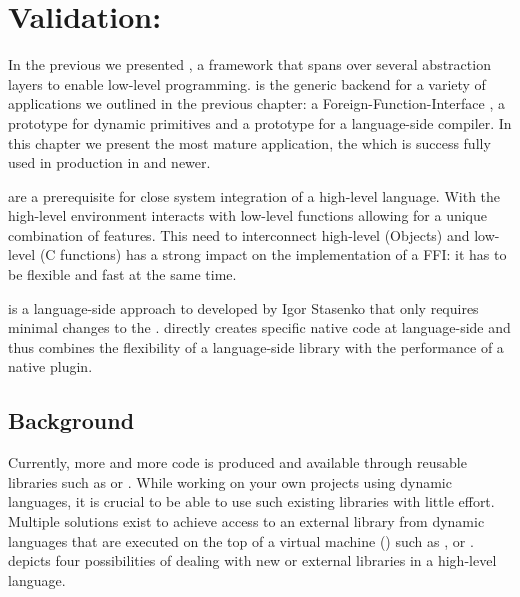 
\chapter{Validation: \FFI}
\minitoc
\introduction

In the previous  we presented \B, a framework that spans over several abstraction layers to enable low-level programming.
\B is the generic backend for a variety of applications we outlined in the previous chapter: a Foreign-Function-Interface \FFI, a prototype for dynamic primitives and a prototype for a language-side \JIT compiler.
In this chapter we present the most mature \B application, the \FFI which is success	fully used in production in  and newer.

\FFIs are a prerequisite for close system integration of a high-level language.
With \FFIs the high-level environment interacts with low-level functions allowing for a unique combination of features.
This need to interconnect high-level (Objects) and low-level (C functions) has a strong impact on the implementation of a FFI: it has to be flexible and fast at the same time.

\NB is a language-side approach to \FFIs developed by Igor Stasenko that only requires minimal changes to the \VM.
\NB directly creates specific native code at language-side and thus combines the flexibility of a language-side library with the performance of a native plugin.

\newpage
\section{Background}
Currently, more and more code is produced and available through reusable libraries such as  or .
While working on your own projects using dynamic languages, it is crucial to be able to use such existing libraries with little effort.
Multiple solutions exist to achieve access to an external library from dynamic languages that are executed on the top of a virtual machine (\VM) such as ,  or .
 depicts four possibilities of dealing with new or external libraries in a high-level language.

